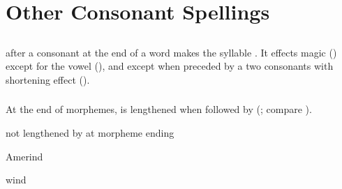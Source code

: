 \section{Other Consonant Spellings}

\subsection{}

 after a consonant at the end of a word makes the syllable . It
effects magic  () except for the vowel
 (), and except when preceded by a two consonants with shortening effect
().


\subsubsection{}

At the end of morphemes,  is lengthened when followed by  (; compare ).

\begin{exceptions}{ not lengthened by  at morpheme ending}
\item Amerind
\item wind
\end{exceptions}

